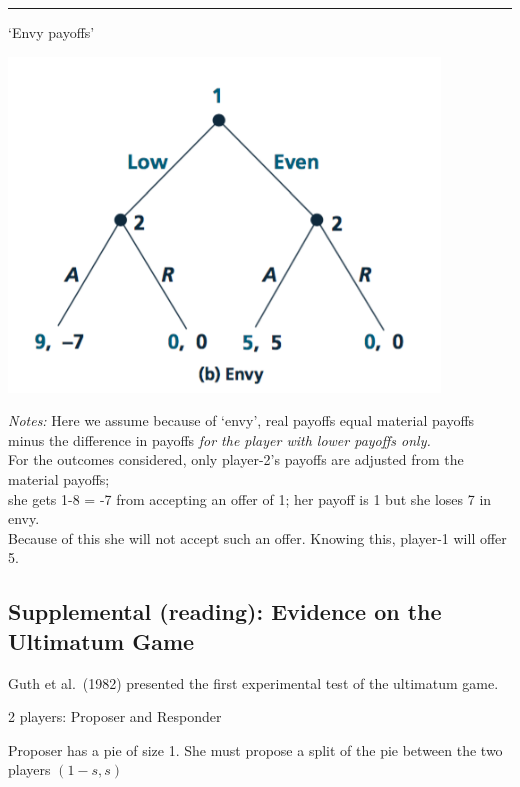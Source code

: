 \documentclass[]{article}
\begin{document}
\begin{center}\rule{0.5\linewidth}{\linethickness}\end{center}

`Envy payoffs'

\includegraphics[height=3.5in]{picsfigs/ultimatumenvy.png}

\emph{Notes:} Here we assume because of `envy', real payoffs equal
material payoffs minus the difference in payoffs \emph{for the player
with lower payoffs only.}\\
For the outcomes considered, only player-2's payoffs are adjusted from
the material payoffs;\\
she gets 1-8 = -7 from accepting an offer of 1; her payoff is 1 but she
loses 7 in envy.\\
Because of this she will not accept such an offer. Knowing this,
player-1 will offer 5.

\hypertarget{supplemental-reading-evidence-on-the-ultimatum-game}{%
\subsection{Supplemental (reading): Evidence on the Ultimatum
Game}\label{supplemental-reading-evidence-on-the-ultimatum-game}}

Guth et al.~(1982) presented the first experimental test of the
ultimatum game.

\bigskip

2 players: Proposer and Responder

\bigskip

Proposer has a pie of size 1. She must propose a split of the pie
between the two players \((1-s, s)\)
\end{document}
